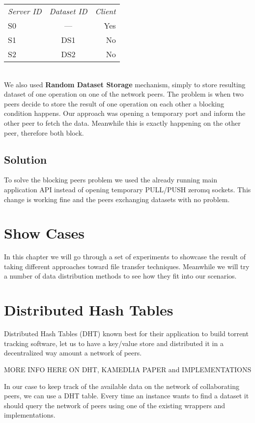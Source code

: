 \begin{tabular}{ l c r }
\em{Server ID} & \em{ Dataset ID} & \em{ Client} \\
S0 & --- & Yes \\
S1 & DS1 & No \\
S2 & DS2 & No \\
\end{tabular}\\

We also used \textbf{Random Dataset Storage} mechanism, simply to store resulting dataset of one operation on one of the network
peers. The problem is when two peers decide to store the result of one operation on each other a blocking condition happens. Our
approach was opening a temporary port and inform the other peer to fetch the data. Meanwhile this is exactly happening on the other
peer, therefore both block.

\subsection{Solution}
To solve the blocking peers problem we used the already running main application API instead of opening temporary PULL/PUSH zeromq 
sockets. This change is working fine and the peers exchanging datasets with no problem.

\section{Show Cases}

In this chapter we will go through a set of experiments to showcase the result of taking different approaches toward file transfer techniques. Meanwhile we will try a number of data distribution methods to see how they fit into our scenarios.

\section{Distributed Hash Tables}
Distributed Hash Tables (DHT) known best for their application to build torrent tracking software, let us to have a key/value store and distributed it in a decentralized way amount a network of peers.

MORE INFO HERE ON DHT, KAMEDLIA PAPER and IMPLEMENTATIONS

In our case to keep track of the available data on the network of collaborating peers, we can use a DHT table. Every time an instance wants to find a dataset it should query the network of peers using one of the existing wrappers and implementations.

